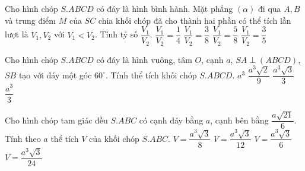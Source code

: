 \begin{ex}%
	Cho hình chóp $S.ABCD$ có đáy là hình bình hành. Mặt phẳng $(\alpha)$ đi qua $A,B$ và trung điểm $M$ của $SC$ chia khối chóp đã cho thành hai phần có thể tích lần lượt là $V_1, V_2$ với $V_1<V_2$. Tính tỷ số $\dfrac{V_1}{V_2}$.
	\choice
	{$\dfrac{V_1}{V_2}=\dfrac{1}{4} $}
	{$\dfrac{V_1}{V_2}=\dfrac{3}{8} $}
	{$\dfrac{V_1}{V_2}=\dfrac{5}{8} $}
	{\True $\dfrac{V_1}{V_2}=\dfrac{3}{5} $}
\end{ex}

\begin{ex}%
	Cho hình chóp $S.ABCD$ có đáy là hình vuông, tâm $O$, cạnh $a$, $SA\perp (ABCD)$, $SB$ tạo với đáy một góc $60^{\circ}$. Tính thể tích khối chóp $S.ABCD$.
	\choice
	{$a^3 $}
	{$\dfrac{a^3\sqrt{2}}{9} $}
	{\True $\dfrac{a^3\sqrt{3}}{3} $}
	{$\dfrac{a^3}{3} $}
	
\end{ex}

\begin{ex}%
	Cho hình chóp tam giác đều $S.ABC$ có cạnh đáy bằng $a$, cạnh bên bằng $\dfrac{a\sqrt{21}}{6}$. Tính theo $a$ thể tích $V$ của khối chóp $S.ABC$.
	\choice
	{$V=\dfrac{a^3\sqrt{3}}{8} $}
	{$V=\dfrac{a^3\sqrt{3}}{12} $}
	{$V=\dfrac{a^3\sqrt{3}}{6} $}
	{\True $V=\dfrac{a^3\sqrt{3}}{24} $}
	
\end{ex}

